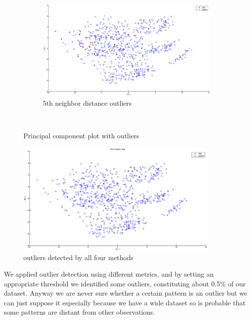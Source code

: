\begin{figure}[htbp]
                \quad
	\begin{subfigure}[b]{0.55\textwidth}
                \includegraphics[width=10cm]{figures/pc4.eps}
                \caption{5th neighbor distance outliers}
         \end{subfigure} \\
        \caption{Principal component plot with outliers}
        \label{fig:r2}
\end{figure}

\begin{figure}[htbp]
        \center
                \includegraphics[width=10cm]{figures/pc5.eps}
                \caption{outliers detected by all four methods}
        \label{fig:r3}
\end{figure}


We applied outlier detection using different metrics, and by setting an appropriate threshold we identified some outliers, constituting about 0.5\% of our dataset. Anyway we are never sure whether a certain pattern is an outlier but we can just suppose it especially because we have a wide dataset so is probable that some patterns are distant from other observations.

